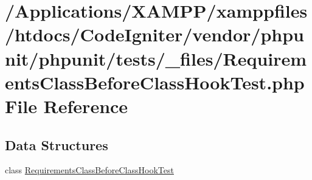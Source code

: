 \hypertarget{_requirements_class_before_class_hook_test_8php}{}\section{/\+Applications/\+X\+A\+M\+P\+P/xamppfiles/htdocs/\+Code\+Igniter/vendor/phpunit/phpunit/tests/\+\_\+files/\+Requirements\+Class\+Before\+Class\+Hook\+Test.php File Reference}
\label{_requirements_class_before_class_hook_test_8php}
\subsection*{Data Structures}
\begin{DoxyCompactItemize}
\item 
class \mbox{\hyperlink{class_requirements_class_before_class_hook_test}{Requirements\+Class\+Before\+Class\+Hook\+Test}}
\end{DoxyCompactItemize}
